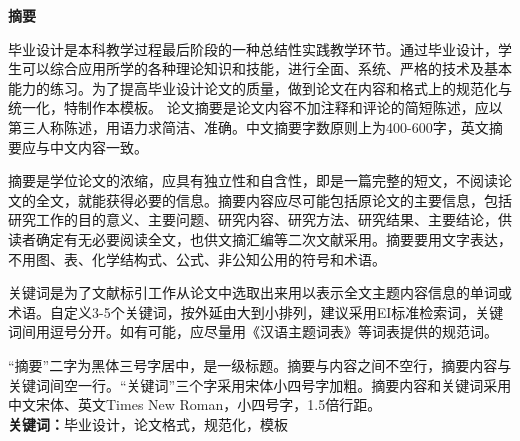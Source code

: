 

\begin{center}\heiti\sanhao\textbf{
        摘要
    }
\end{center}

毕业设计是本科教学过程最后阶段的一种总结性实践教学环节。通过毕业设计，学生可以综合应用所学的各种理论知识和技能，进行全面、系统、严格的技术及基本能力的练习。为了提高毕业设计论文的质量，做到论文在内容和格式上的规范化与统一化，特制作本模板。
论文摘要是论文内容不加注释和评论的简短陈述，应以第三人称陈述，用语力求简洁、准确。中文摘要字数原则上为400-600字，英文摘要应与中文内容一致。

摘要是学位论文的浓缩，应具有独立性和自含性，即是一篇完整的短文，不阅读论文的全文，就能获得必要的信息。摘要内容应尽可能包括原论文的主要信息，包括研究工作的目的意义、主要问题、研究内容、研究方法、研究结果、主要结论，供读者确定有无必要阅读全文，也供文摘汇编等二次文献采用。摘要要用文字表达，不用图、表、化学结构式、公式、非公知公用的符号和术语。 

关键词是为了文献标引工作从论文中选取出来用以表示全文主题内容信息的单词或术语。自定义3-5个关键词，按外延由大到小排列，建议采用EI标准检索词，关键词间用逗号分开。如有可能，应尽量用《汉语主题词表》等词表提供的规范词。

“摘要”二字为黑体三号字居中，是一级标题。摘要与内容之间不空行，摘要内容与关键词间空一行。“关键词”三个字采用宋体小四号字加粗。摘要内容和关键词采用中文宋体、英文Times New Roman，小四号字，1.5倍行距。\\

\textbf{关键词：}毕业设计，论文格式，规范化，模板

\clearpage